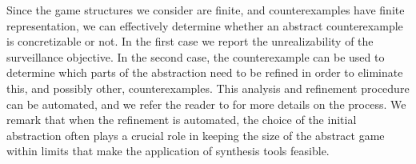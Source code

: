Since the game structures we consider are finite, and counterexamples have finite representation, we can effectively determine whether an abstract counterexample is concretizable or not. In the first case we report the unrealizability of the surveillance objective. In the second case, the counterexample can be used to determine which parts of the abstraction need to be refined in order to eliminate this, and possibly other, counterexamples. This analysis and refinement procedure can be automated, and we refer the reader to \cite{arxiv} for more details on the process. We remark that when the refinement is automated, the choice of the initial abstraction often plays a crucial role in keeping the size of the abstract game within limits that make the application of synthesis tools feasible.
